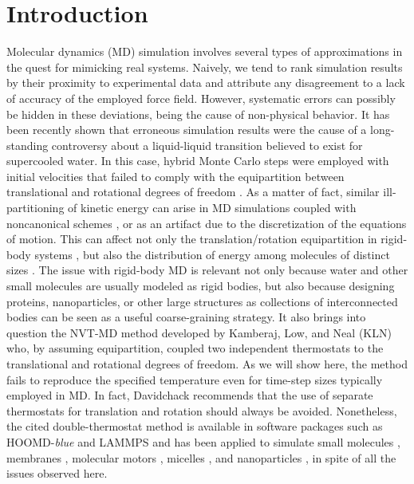 \documentclass[
	aip,
	jcp,
	reprint,
]{revtex4-1}
\begin{document}
\section{Introduction}

Molecular dynamics (MD) simulation involves several types of approximations in the quest for mimicking real systems.
Naively, we tend to rank simulation results by their proximity to experimental data and attribute any disagreement to a lack of accuracy of the employed force field.
However, systematic errors can possibly be hidden in these deviations, being the cause of non-physical behavior.
It has been recently shown \cite{Palmer_2018} that erroneous simulation results \cite{Limmer_2011, Limmer_2013} were the cause of a long-standing controversy \cite{Smart_2018} about a liquid-liquid transition believed to exist for supercooled water.
In this case, hybrid Monte Carlo steps were employed with initial velocities that failed to comply with the equipartition between translational and rotational degrees of freedom \cite{Palmer_2018}.
As a matter of fact, similar ill-partitioning of kinetic energy can arise in MD simulations coupled with noncanonical schemes \cite{Braun_2018}, or as an artifact due to the discretization of the equations of motion.
This can affect not only the translation/rotation equipartition in rigid-body systems \cite{Davidchack_2010, Silveira_2017}, but also the distribution of energy among molecules of distinct sizes \cite{Eastwood_2010}.
The issue with rigid-body MD is relevant not only because water \cite{Jorgensen_1983} and other small molecules are usually modeled as rigid bodies, but also because designing proteins, nanoparticles, or other large structures as collections of interconnected bodies \cite{Miller_2002, Knorowski_2012, Patra_2013} can be seen as a useful coarse-graining strategy.
It also brings into question the NVT-MD method developed by Kamberaj, Low, and Neal \cite{Kamberaj_2005} (KLN) who, by assuming equipartition, coupled two independent thermostats to the translational and rotational degrees of freedom.
As we will show here, the method fails to reproduce the specified temperature even for time-step sizes typically employed in MD.
In fact, Davidchack \cite{Davidchack_2010} recommends that the use of separate thermostats for translation and rotation should always be avoided.
Nonetheless, the cited double-thermostat method is available in software packages such as HOOMD-\textit{blue}\cite{Anderson_2008} and LAMMPS\cite{Plimpton_1995} and has been applied to simulate small molecules \cite{Geiger_2013, Aimoli_2014, Aimoli_2014_2}, membranes \cite{Bucior_2012}, molecular motors \cite{Akimov_2012}, micelles \cite{Yan_2008}, and nanoparticles \cite{Patra_2014}, in spite of all the issues observed here.
\end{document}

